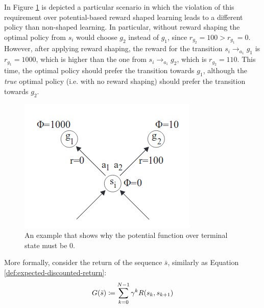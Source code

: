 In Figure \ref{fig:reward-shaping-terminal-state} is depicted a particular scenario in which the violation of this requirement over potential-based reward shaped learning leads to a different policy than non-shaped learning. In particular, without reward shaping the optimal policy from $s_i$ would choose $g_2$ instead of $g_1$, since $r_{g_2} = 100 > r_{g_1} = 0$. However, after applying reward shaping, the reward for the transition $s_i \to_{a_1} g_1$ is $r_{g_1} = 1000$, which is higher than the one from $s_i \to_{a_1} g_2$, which is $r_{g_2} = 110$. This time, the optimal policy should prefer the transition towards $g_1$, although the \emph{true} optimal policy (i.e. with no reward shaping) should prefer the transition towards $g_2$.
\begin{figure}[!h]
	\centering
	\includegraphics[width=.5\linewidth]{images/reward-shaping-terminal-state}
	\caption{An example that shows why the potential function over terminal state must be 0.}\label{fig:reward-shaping-terminal-state}
\end{figure}

More formally, consider the return of the sequence $\bar{s}$, similarly as Equation \ref{def:expected-discounted-return}:
\begin{equation}\label{def:expected-discounted-return-finite-seq}
G(\bar{s}) \coloneqq \sum_{k=0}^{N-1} \gamma^{k}R(s_k, s_{k+1})
\end{equation}

